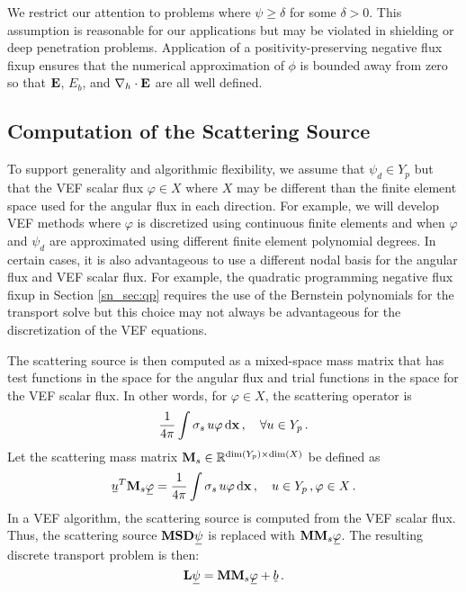 \documentclass[../doc.tex]{subfiles}
\begin{document}
We restrict our attention to problems where $\psi\geq\delta$ for some $\delta > 0$. This assumption is reasonable for our applications but may be violated in shielding or deep penetration problems. Application of a positivity-preserving negative flux fixup ensures that the numerical approximation of $\phi$ is bounded away from zero so that $\boldsymbol{\mathrm{E}}$, $E_b$, and $\nabla_h\cdot\boldsymbol{\mathrm{E}}$ are all well defined. 

\subsection{Computation of the Scattering Source}
To support generality and algorithmic flexibility, we assume that $\psi_d \in Y_p$ but that the VEF scalar flux $\varphi \in X$ where $X$ may be different than the finite element space used for the angular flux in each direction. For example, we will develop VEF methods where $\varphi$ is discretized using continuous finite elements and when $\varphi$ and $\psi_d$ are approximated using different finite element polynomial degrees. In certain cases, it is also advantageous to use a different nodal basis for the angular flux and VEF scalar flux. For example, the quadratic programming negative flux fixup in Section \ref{sn_sec:qp} requires the use of the Bernstein polynomials for the transport solve but this choice may not always be advantageous for the discretization of the VEF equations. 

The scattering source is then computed as a mixed-space mass matrix that has test functions in the space for the angular flux and trial functions in the space for the VEF scalar flux. In other words, for $\varphi \in X$, the scattering operator is 
	\begin{equation}
		\frac{1}{4\pi}\int \sigma_s\, u \varphi \mathop{}\!\mathrm{d} \boldsymbol{\mathrm{x}} \,, \quad \forall u \in Y_p \,. 		
	\end{equation}
Let the scattering mass matrix $\boldsymbol{\mathrm{M}}_s \in \mathbb{R}^{\dim(Y_p) \times \dim(X)}$ be defined as 
	\begin{equation}
		\ubar{u}^T\mat{M}_s \ubar{\varphi} = \frac{1}{4\pi}\int \sigma_s\, u\varphi \ud \x \,, \quad u \in Y_p \,, \varphi \in X \,. 
	\end{equation}
In a VEF algorithm, the scattering source is computed from the VEF scalar flux. Thus, the scattering source $\mat{M}\mat{S}\mat{D}\ubar{\psi}$ is replaced with $\mat{M}\mat{M}_s\ubar{\varphi}$. The resulting discrete transport problem is then: 
	\begin{equation}
		\mat{L}\ubar{\psi} = \mat{M}\mat{M}_s \ubar{\varphi} + \ubar{b} \,. 
	\end{equation}
\end{document}
